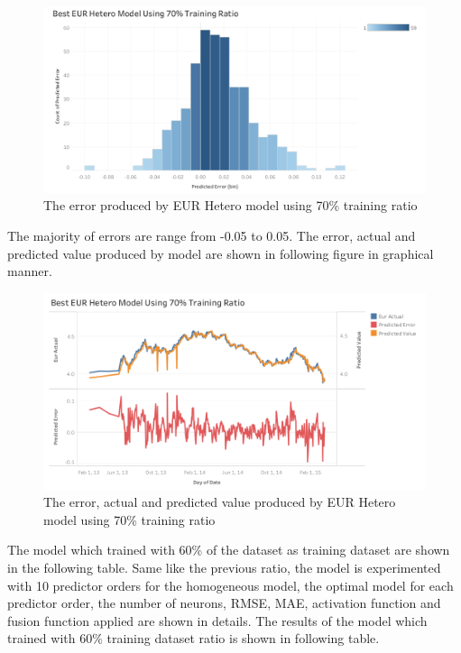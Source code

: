 {{{{{{{{{{{{{{		\begin{figure}[hbt!]\centering
			\includegraphics[width=1\textwidth]{hetero_eur_70}
			\caption{The error produced by EUR Hetero model  using 70\% training ratio}
		\end{figure}
		\pagebreak
The majority of errors are range from -0.05 to 0.05. The error, actual and predicted value produced by model are shown in following figure in graphical manner.  
		\begin{figure}[hbt!]\centering
			\includegraphics[width=1\textwidth]{best_eur_hetero_APV_70}
			\caption{The error, actual and predicted value produced by EUR Hetero model using 70\% training ratio }
		\end{figure}
		\pagebreak
		
The model which trained with 60\% of the dataset as training dataset are shown in the following table. Same like the previous ratio, the model is  experimented with 10 predictor orders for the homogeneous model, the optimal model for each predictor order, the number of neurons, RMSE, MAE, activation function and fusion function applied are shown in details. The results of the model which trained with 60\% training dataset ratio is shown in following table.
		\\
		
}}}}}}}}}}}}}}
